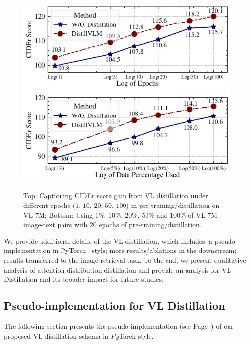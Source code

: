 \begin{figure}[t]
    \centering
    \includegraphics[width=.95\textwidth]{images/Effect_Epoch.pdf} 
    \includegraphics[width=.95\textwidth]{images/Effect_Data.pdf} 
    \caption[Captioning CIDEr scores gain from VL distillation under different epochs and portions of data.]{ Top: Captioning CIDEr score gain from VL distillation under different epochs ($1$, $10$, $20$, $50$, $100$) in  pre-training/distillation on VL-7M; Bottom: Using $1\%$, $10\%$, $20\%$, $50\%$ and $100\%$ of VL-7M image-text pairs with $20$ epochs of pre-training/distillation. }
    \vspace{-4mm}
    \label{fig:epoch} 
\end{figure}


\noindent We provide additional details of the VL distillation, which includes: a pseudo-implementation in PyTorch~\cite{paszke2017automatic} style; more results/ablations in the downstream; \distillvlm results transferred to the image retrieval task. To the end, we present qualitative analysis of attention distribution distillation and provide an analysis for VL Distillation and its broader impact for future studies.



\subsection*{Pseudo-implementation for VL Distillation}
The following section presents the pseudo implementation (see Page~\pageref{fig:pseudocode}) of our proposed VL distillation schema in \textit{Py}Torch style.


